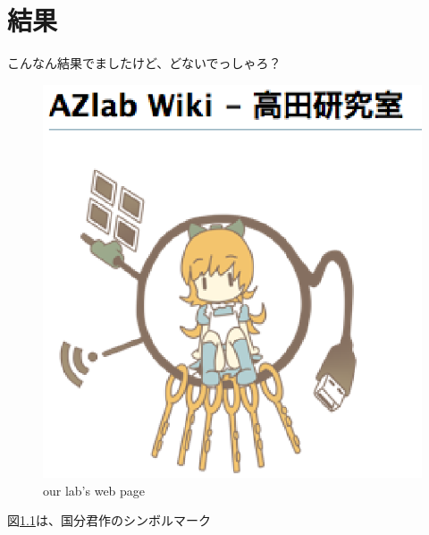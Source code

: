 \chapter{結果}\label{chap:results}

こんなん結果でましたけど、どないでっしゃろ？

\begin{figure}[ht]
\begin{center}
\includegraphics[scale=1.0]{img/azlabMark.eps}
\caption{our lab's web page}
\label{fig:azweb}
\end{center}
\end{figure}

図\ref{fig:azweb}は、国分君作のシンボルマーク

\newpage

